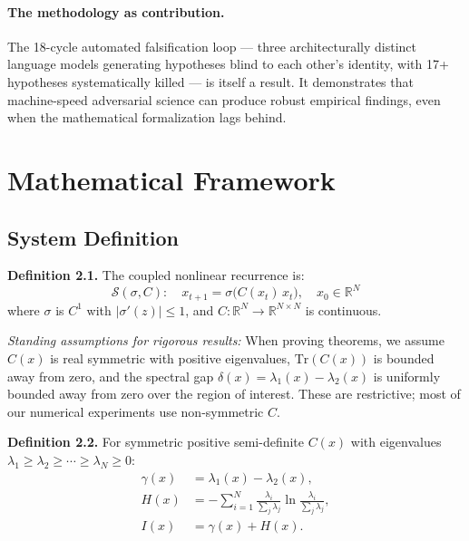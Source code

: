 \documentclass[11pt]{article}
\begin{document}
\paragraph{The methodology as contribution.}
The 18-cycle automated falsification loop --- three architecturally distinct language models generating hypotheses blind to each other's identity, with 17+ hypotheses systematically killed --- is itself a result. It demonstrates that machine-speed adversarial science can produce robust empirical findings, even when the mathematical formalization lags behind.

\section{Mathematical Framework}

\subsection{System Definition}

\textbf{Definition 2.1.} The coupled nonlinear recurrence is:
\begin{equation}
  \mathcal{S}(\sigma, C): \quad x_{t+1} = \sigma\bigl(C(x_t)\, x_t\bigr), \quad x_0 \in \mathbb{R}^N
\end{equation}
where $\sigma$ is $C^1$ with $|\sigma'(z)| \leq 1$, and $C: \mathbb{R}^N \to \mathbb{R}^{N \times N}$ is continuous.

\textit{Standing assumptions for rigorous results:} When proving theorems, we assume $C(x)$ is real symmetric with positive eigenvalues, $\mathrm{Tr}(C(x))$ is bounded away from zero, and the spectral gap $\delta(x) = \lambda_1(x) - \lambda_2(x)$ is uniformly bounded away from zero over the region of interest. These are restrictive; most of our numerical experiments use non-symmetric $C$.

\textbf{Definition 2.2.} For symmetric positive semi-definite $C(x)$ with eigenvalues $\lambda_1 \geq \lambda_2 \geq \cdots \geq \lambda_N \geq 0$:
\begin{align}
  \gamma(x) &= \lambda_1(x) - \lambda_2(x), \\
  H(x) &= -\sum_{i=1}^N \frac{\lambda_i}{\sum_j \lambda_j} \ln \frac{\lambda_i}{\sum_j \lambda_j}, \\
  I(x) &= \gamma(x) + H(x).
\end{align}
\end{document}
